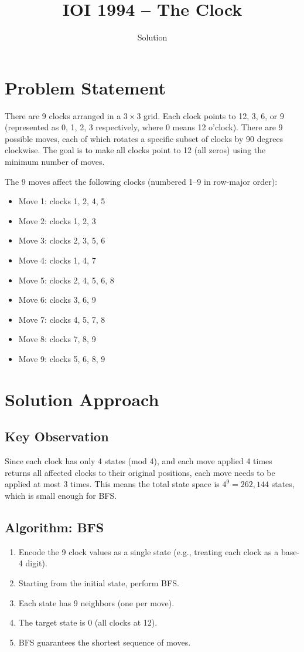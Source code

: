 \documentclass[11pt,a4paper]{article}
\title{IOI 1994 -- The Clock}
\author{Solution}
\date{}
\begin{document}
\maketitle

\section{Problem Statement}

There are 9 clocks arranged in a $3 \times 3$ grid. Each clock points to 12, 3, 6, or 9
(represented as 0, 1, 2, 3 respectively, where 0 means 12 o'clock).
There are 9 possible moves, each of which rotates a specific subset of clocks
by 90 degrees clockwise. The goal is to make all clocks point to 12 (all zeros)
using the minimum number of moves.

\medskip
\noindent The 9 moves affect the following clocks (numbered 1--9 in row-major order):
\begin{itemize}
  \item Move 1: clocks 1, 2, 4, 5
  \item Move 2: clocks 1, 2, 3
  \item Move 3: clocks 2, 3, 5, 6
  \item Move 4: clocks 1, 4, 7
  \item Move 5: clocks 2, 4, 5, 6, 8
  \item Move 6: clocks 3, 6, 9
  \item Move 7: clocks 4, 5, 7, 8
  \item Move 8: clocks 7, 8, 9
  \item Move 9: clocks 5, 6, 8, 9
\end{itemize}

\section{Solution Approach}

\subsection{Key Observation}
Since each clock has only 4 states (mod 4), and each move applied 4 times returns
all affected clocks to their original positions, each move needs to be applied
at most 3 times. This means the total state space is $4^9 = 262{,}144$ states,
which is small enough for BFS.

\subsection{Algorithm: BFS}
\begin{enumerate}
  \item Encode the 9 clock values as a single state (e.g., treating each clock as
        a base-4 digit).
  \item Starting from the initial state, perform BFS.
  \item Each state has 9 neighbors (one per move).
  \item The target state is $0$ (all clocks at 12).
  \item BFS guarantees the shortest sequence of moves.
\end{enumerate}
\end{document}
